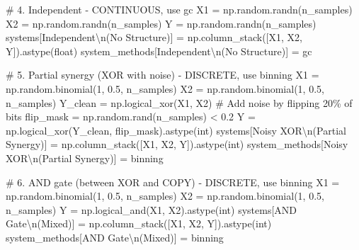 \documentclass[
  11pt,
  letterpaper,
  oneside,
  openany]{book}
\newenvironment{Shaded}{\begin{snugshade}}{\end{snugshade}}
\newcommand{\BuiltInTok}[1]{\textcolor[rgb]{0.00,0.23,0.31}{#1}}
\newcommand{\CharTok}[1]{\textcolor[rgb]{0.13,0.47,0.30}{#1}}
\newcommand{\CommentTok}[1]{\textcolor[rgb]{0.37,0.37,0.37}{#1}}
\newcommand{\DecValTok}[1]{\textcolor[rgb]{0.68,0.00,0.00}{#1}}
\newcommand{\FloatTok}[1]{\textcolor[rgb]{0.68,0.00,0.00}{#1}}
\newcommand{\NormalTok}[1]{\textcolor[rgb]{0.00,0.23,0.31}{#1}}
\newcommand{\OperatorTok}[1]{\textcolor[rgb]{0.37,0.37,0.37}{#1}}
\newcommand{\StringTok}[1]{\textcolor[rgb]{0.13,0.47,0.30}{#1}}
\begin{document}
\begin{Shaded}
\begin{Highlighting}[]
\CommentTok{\# 4. Independent {-} CONTINUOUS, use gc}
\NormalTok{X1 }\OperatorTok{=}\NormalTok{ np.random.randn(n\_samples)}
\NormalTok{X2 }\OperatorTok{=}\NormalTok{ np.random.randn(n\_samples)}
\NormalTok{Y }\OperatorTok{=}\NormalTok{ np.random.randn(n\_samples)}
\NormalTok{systems[}\StringTok{\textquotesingle{}Independent}\CharTok{\textbackslash{}n}\StringTok{(No Structure)\textquotesingle{}}\NormalTok{] }\OperatorTok{=}\NormalTok{ np.column\_stack([X1, X2, Y]).astype(}\BuiltInTok{float}\NormalTok{)}
\NormalTok{system\_methods[}\StringTok{\textquotesingle{}Independent}\CharTok{\textbackslash{}n}\StringTok{(No Structure)\textquotesingle{}}\NormalTok{] }\OperatorTok{=} \StringTok{\textquotesingle{}gc\textquotesingle{}}

\CommentTok{\# 5. Partial synergy (XOR with noise) {-} DISCRETE, use binning}
\NormalTok{X1 }\OperatorTok{=}\NormalTok{ np.random.binomial(}\DecValTok{1}\NormalTok{, }\FloatTok{0.5}\NormalTok{, n\_samples)}
\NormalTok{X2 }\OperatorTok{=}\NormalTok{ np.random.binomial(}\DecValTok{1}\NormalTok{, }\FloatTok{0.5}\NormalTok{, n\_samples)}
\NormalTok{Y\_clean }\OperatorTok{=}\NormalTok{ np.logical\_xor(X1, X2)}
\CommentTok{\# Add noise by flipping 20\% of bits}
\NormalTok{flip\_mask }\OperatorTok{=}\NormalTok{ np.random.rand(n\_samples) }\OperatorTok{\textless{}} \FloatTok{0.2}
\NormalTok{Y }\OperatorTok{=}\NormalTok{ np.logical\_xor(Y\_clean, flip\_mask).astype(}\BuiltInTok{int}\NormalTok{)}
\NormalTok{systems[}\StringTok{\textquotesingle{}Noisy XOR}\CharTok{\textbackslash{}n}\StringTok{(Partial Synergy)\textquotesingle{}}\NormalTok{] }\OperatorTok{=}\NormalTok{ np.column\_stack([X1, X2, Y]).astype(}\BuiltInTok{int}\NormalTok{)}
\NormalTok{system\_methods[}\StringTok{\textquotesingle{}Noisy XOR}\CharTok{\textbackslash{}n}\StringTok{(Partial Synergy)\textquotesingle{}}\NormalTok{] }\OperatorTok{=} \StringTok{\textquotesingle{}binning\textquotesingle{}}

\CommentTok{\# 6. AND gate (between XOR and COPY) {-} DISCRETE, use binning}
\NormalTok{X1 }\OperatorTok{=}\NormalTok{ np.random.binomial(}\DecValTok{1}\NormalTok{, }\FloatTok{0.5}\NormalTok{, n\_samples)}
\NormalTok{X2 }\OperatorTok{=}\NormalTok{ np.random.binomial(}\DecValTok{1}\NormalTok{, }\FloatTok{0.5}\NormalTok{, n\_samples)}
\NormalTok{Y }\OperatorTok{=}\NormalTok{ np.logical\_and(X1, X2).astype(}\BuiltInTok{int}\NormalTok{)}
\NormalTok{systems[}\StringTok{\textquotesingle{}AND Gate}\CharTok{\textbackslash{}n}\StringTok{(Mixed)\textquotesingle{}}\NormalTok{] }\OperatorTok{=}\NormalTok{ np.column\_stack([X1, X2, Y]).astype(}\BuiltInTok{int}\NormalTok{)}
\NormalTok{system\_methods[}\StringTok{\textquotesingle{}AND Gate}\CharTok{\textbackslash{}n}\StringTok{(Mixed)\textquotesingle{}}\NormalTok{] }\OperatorTok{=} \StringTok{\textquotesingle{}binning\textquotesingle{}}


\end{Highlighting}
\end{Shaded}
\end{document}
